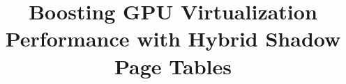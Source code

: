 \documentclass[letterpaper,twocolumn,10pt]{article}
\begin{document}
\date{}



\title{\Large \bf Boosting GPU Virtualization Performance with Hybrid
Shadow Page Tables}



\maketitle












\balance
{\footnotesize 
}


\end{document}
